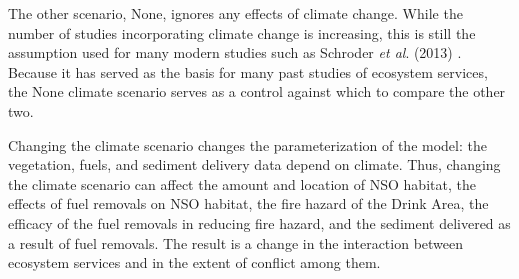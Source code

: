 The other scenario, None, ignores any effects of climate change. While the number of studies incorporating climate change is increasing, this is still the assumption used for many modern studies such as Schroder \textit{et al}. (2013) \cite{schroder2016multi}. Because it has served as the basis for many past studies of ecosystem services, the None climate scenario serves as a control against which to compare the other two.

Changing the climate scenario changes the parameterization of the model: the vegetation, fuels, and sediment delivery data depend on climate. Thus, changing the climate scenario can affect the amount and location of NSO habitat, the effects of fuel removals on NSO habitat, the fire hazard of the Drink Area, the efficacy of the fuel removals in reducing fire hazard, and the sediment delivered as a result of fuel removals. The result is a change in the interaction between ecosystem services and in the extent of conflict among them.